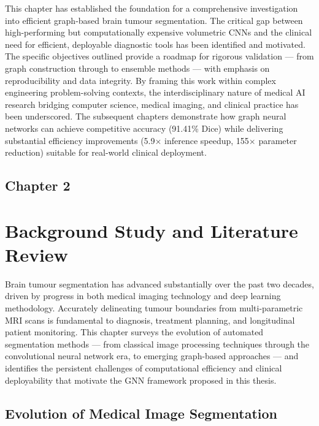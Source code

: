 \documentclass{article}
\begin{document}
This chapter has established the foundation for a comprehensive investigation into efficient graph-based brain tumour segmentation. The critical gap between high-performing but computationally expensive volumetric CNNs and the clinical need for efficient, deployable diagnostic tools has been identified and motivated. The specific objectives outlined provide a roadmap for rigorous validation — from graph construction through to ensemble methods — with emphasis on reproducibility and data integrity. By framing this work within complex engineering problem-solving contexts, the interdisciplinary nature of medical AI research bridging computer science, medical imaging, and clinical practice has been underscored. The subsequent chapters demonstrate how graph neural networks can achieve competitive accuracy (91.41\% Dice) while delivering substantial efficiency improvements (5.9$\times$ inference speedup, 155$\times$ parameter reduction) suitable for real-world clinical deployment.
\cleardoublepage
\begin{center}
    \section*{\fontsize{20}{20}\selectfont Chapter 2}
\end{center}
\vspace{10mm}
\section{Background Study and Literature Review}

Brain tumour segmentation has advanced substantially over the past two decades, driven by progress in both medical imaging technology and deep learning methodology. Accurately delineating tumour boundaries from multi-parametric MRI scans is fundamental to diagnosis, treatment planning, and longitudinal patient monitoring. This chapter surveys the evolution of automated segmentation methods — from classical image processing techniques through the convolutional neural network era, to emerging graph-based approaches — and identifies the persistent challenges of computational efficiency and clinical deployability that motivate the GNN framework proposed in this thesis.

\subsection{Evolution of Medical Image Segmentation}
\end{document}
